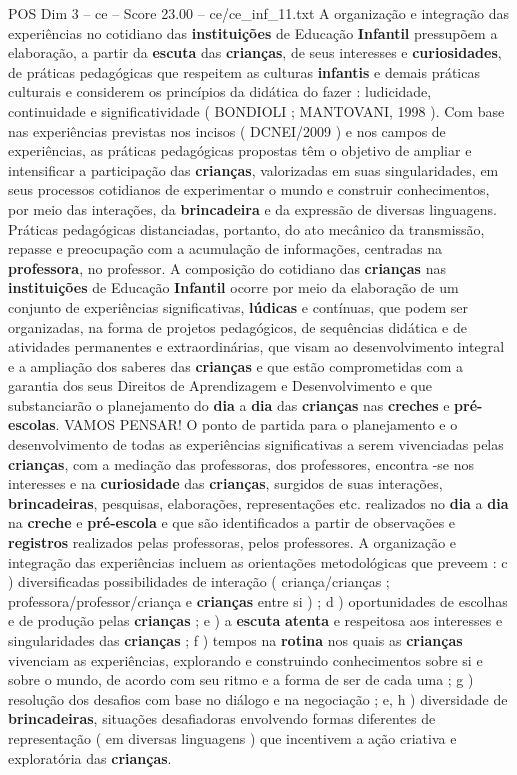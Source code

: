 \begin{textsample}{POS Dim 3 – ce – Score 23.00 – ce/ce\_inf\_11.txt}
A organização e integração das experiências no cotidiano das \textbf{instituições} de Educação \textbf{Infantil} pressupõem a elaboração, a partir da \textbf{escuta} das \textbf{crianças}, de seus interesses e \textbf{curiosidades}, de práticas pedagógicas que respeitem as culturas \textbf{infantis} e demais práticas culturais e considerem os princípios da didática do fazer : ludicidade, continuidade e significatividade ( BONDIOLI ; MANTOVANI, 1998 ).
Com base nas experiências previstas nos incisos ( DCNEI/2009 ) e nos campos de experiências, as práticas pedagógicas propostas têm o objetivo de ampliar e intensificar a participação das \textbf{crianças}, valorizadas em suas singularidades, em seus processos cotidianos de experimentar o mundo e construir conhecimentos, por meio das interações, da \textbf{brincadeira} e da expressão de diversas linguagens.
Práticas pedagógicas distanciadas, portanto, do ato mecânico da transmissão, repasse e preocupação com a acumulação de informações, centradas na \textbf{professora}, no professor.
A composição do cotidiano das \textbf{crianças} nas \textbf{instituições} de Educação \textbf{Infantil} ocorre por meio da elaboração de um conjunto de experiências significativas, \textbf{lúdicas} e contínuas, que podem ser organizadas, na forma de projetos pedagógicos, de sequências didática e de atividades permanentes e extraordinárias, que visam ao desenvolvimento integral e a ampliação dos saberes das \textbf{crianças} e que estão comprometidas com a garantia dos seus Direitos de Aprendizagem e Desenvolvimento e que substanciarão o planejamento do \textbf{dia} a \textbf{dia} das \textbf{crianças} nas \textbf{creches} e \textbf{pré-escolas}.
VAMOS PENSAR!
O ponto de partida para o planejamento e o desenvolvimento de todas as experiências significativas a serem vivenciadas pelas \textbf{crianças}, com a mediação das professoras, dos professores, encontra -se nos interesses e na \textbf{curiosidade} das \textbf{crianças}, surgidos de suas interações, \textbf{brincadeiras}, pesquisas, elaborações, representações etc. realizados no \textbf{dia} a \textbf{dia} na \textbf{creche} e \textbf{pré-escola} e que são identificados a partir de observações e \textbf{registros} realizados pelas professoras, pelos professores.
A organização e integração das experiências incluem as orientações metodológicas que preveem : c ) diversificadas possibilidades de interação ( criança/crianças ; professora/professor/criança e \textbf{crianças} entre si ) ; d ) oportunidades de escolhas e de produção pelas \textbf{crianças} ; e ) a \textbf{escuta} \textbf{atenta} e respeitosa aos interesses e singularidades das \textbf{crianças} ; f ) tempos na \textbf{rotina} nos quais as \textbf{crianças} vivenciam as experiências, explorando e construindo conhecimentos sobre si e sobre o mundo, de acordo com seu ritmo e a forma de ser de cada uma ; g ) resolução dos desafios com base no diálogo e na negociação ; e, h ) diversidade de \textbf{brincadeiras}, situações desafiadoras envolvendo formas diferentes de representação ( em diversas linguagens ) que incentivem a ação criativa e exploratória das \textbf{crianças}.

\end{textsample}
